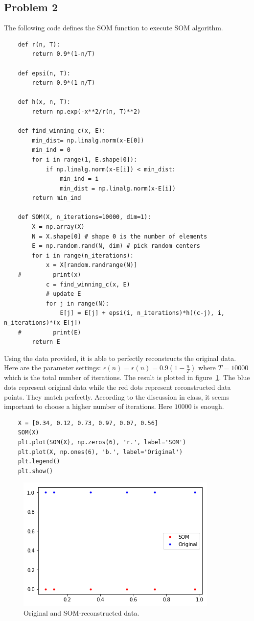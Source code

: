 \documentclass{article}
\begin{document}
\subsection*{Problem 2}
The following code defines the SOM function to execute SOM algorithm.
\begin{lstlisting}
	def r(n, T):
		return 0.9*(1-n/T)
		
	def epsi(n, T):
		return 0.9*(1-n/T)

	def h(x, n, T):
		return np.exp(-x**2/r(n, T)**2)

	def find_winning_c(x, E):
		min_dist= np.linalg.norm(x-E[0])
		min_ind = 0
		for i in range(1, E.shape[0]):
			if np.linalg.norm(x-E[i]) < min_dist:
				min_ind = i
				min_dist = np.linalg.norm(x-E[i])
		return min_ind

	def SOM(X, n_iterations=10000, dim=1):
		X = np.array(X)
		N = X.shape[0] # shape 0 is the number of elements
		E = np.random.rand(N, dim) # pick random centers
		for i in range(n_iterations):
			x = X[random.randrange(N)]
	#         print(x)
			c = find_winning_c(x, E)
			# update E
			for j in range(N):
				E[j] = E[j] + epsi(i, n_iterations)*h((c-j), i, n_iterations)*(x-E[j])
	#         print(E)
		return E
\end{lstlisting}
Using the data provided, it is able to perfectly reconstructs the original data. Here are the parameter settings: $\epsilon(n) = r(n) = 0.9(1-\frac{n}{T})$ where $T=10000$ which is the total number of iterations. The result is plotted in figure~\ref{fig:2}. The blue dots represent original data while the red dots represent reconstructed data points. They match perfectly. According to the discussion in class, it seems important to choose a higher number of iterations. Here $10000$ is enough. 
\begin{lstlisting}
	X = [0.34, 0.12, 0.73, 0.97, 0.07, 0.56]
	SOM(X)
	plt.plot(SOM(X), np.zeros(6), 'r.', label='SOM')
	plt.plot(X, np.ones(6), 'b.', label='Original')
	plt.legend()
	plt.show()
\end{lstlisting}

\begin{figure}[h!]
\centering
\includegraphics[width=0.6\linewidth]{../images/2.png}
\caption{Original and SOM-reconstructed data.}
\label{fig:2}
\end{figure}
\end{document}
